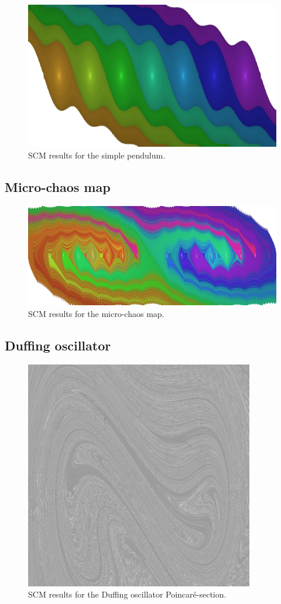 \documentclass{article}
\begin{document}
\begin{figure}[h]
	\centering
	\includegraphics[width=12cm]{fig/pendulum.jpg}
	\caption{SCM results for the simple pendulum.}
\end{figure}


\subsection{Micro-chaos map}

\begin{figure}[h]
	\centering
	\includegraphics[width=12cm]{fig/microchaos.jpg}
	\caption{SCM results for the micro-chaos map.}
\end{figure}

\subsection{Duffing oscillator}

\begin{figure}[h]
	\centering
	\includegraphics[width=10cm]{fig/duffing.jpg}
	\caption{SCM results for the Duffing oscillator Poincaré-section.}
\end{figure}
\end{document}
